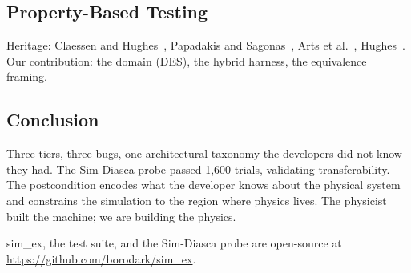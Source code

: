 \documentclass[sigplan,review,anonymous=false]{acmart}
\begin{document}
\subsection{Property-Based Testing}

Heritage: Claessen and Hughes~\cite{claessen2000}, Papadakis and
Sagonas~\cite{papadakis2011}, Arts et al.~\cite{arts2006},
Hughes~\cite{hughes2007,hughes2016}. Our contribution: the domain
(DES), the hybrid harness, the equivalence framing.

\subsection{Conclusion}

Three tiers, three bugs, one architectural taxonomy the developers did
not know they had. The Sim-Diasca probe passed 1,600 trials, validating
transferability. The postcondition encodes what the developer knows
about the physical system and constrains the simulation to the region
where physics lives. The physicist built the machine; we are building
the physics.

sim\_ex, the test suite, and the Sim-Diasca probe are open-source at
\url{https://github.com/borodark/sim_ex}.
\end{document}
